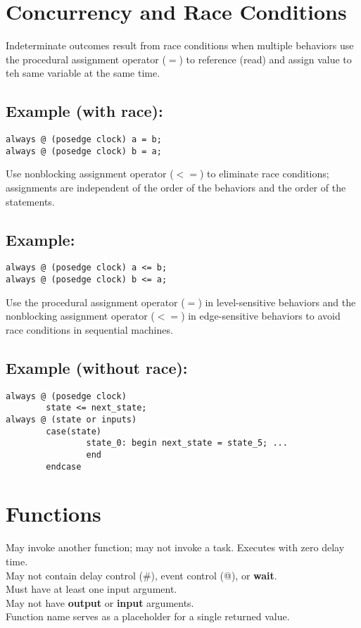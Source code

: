 \documentclass[10pt,twocolumn]{article}
\begin{document}
\section*{Concurrency and Race Conditions}\vspace{-10pt}
Indeterminate outcomes result from race conditions when multiple behaviors use the procedural assignment operator ($=$) to reference (read) and assign value to teh same variable at the same time.
\subsection*{Example (with race):}\vspace{-10pt}
\begin{lstlisting}
always @ (posedge clock) a = b;
always @ (posedge clock) b = a;
\end{lstlisting}
Use nonblocking assignment operator ($<=$) to eliminate race conditions; assignments are independent of the order of the behaviors and the order of the statements.
\subsection*{Example:}\vspace{-10pt}
\begin{lstlisting}
always @ (posedge clock) a <= b;
always @ (posedge clock) b <= a;
\end{lstlisting}
Use the procedural assignment operator ($=$) in level-sensitive behaviors and the nonblocking assignment operator ($<=$) in edge-sensitive behaviors to avoid race conditions in sequential machines.
\subsection*{Example (without race):}\vspace{-10pt}
\begin{lstlisting}
always @ (posedge clock) 
        state <= next_state;
always @ (state or inputs)
        case(state)
                state_0: begin next_state = state_5; ...
                end
        endcase
\end{lstlisting}
%
\section*{Functions}\vspace{-10pt}
May invoke another function; may not invoke a task. Executes with zero delay time.\\
May not contain delay control (\#), event control (@), or \textbf{wait}.\\
Must have at least one input argument.\\
May not have \textbf{output} or \textbf{input} arguments.\\
Function name serves as a placeholder for a single returned value.
\end{document}
